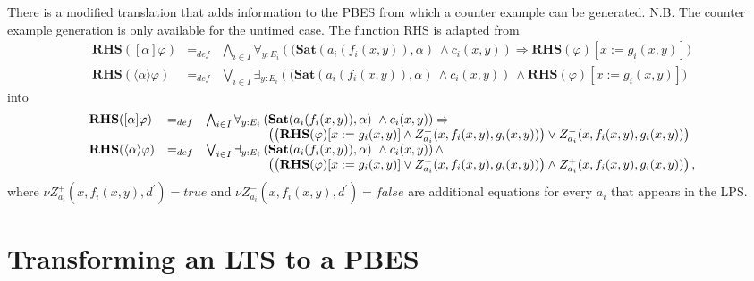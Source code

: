 There is a modified translation that adds information to the PBES from which
a counter example can be generated. N.B. The counter example generation is
only available for the untimed case. The function RHS is adapted from%
\begin{equation*}
\begin{array}{lll}
{\mathbf{RHS}}([\alpha ]\varphi ) & =_{def} & \bigwedge_{i{\in }I}\forall _{y%
{:}E_{i}}\left( (\mathbf{Sat}(a_{i}(f_{i}(x,y)),\alpha )\ \wedge
c_{i}(x,y)\right) \Rightarrow {\mathbf{RHS}}(\varphi )[x:=g_{i}(x,y)]) \\ 
{\mathbf{RHS}}(\langle \alpha \rangle \varphi ) & =_{def} & \bigvee_{i{\in }%
I}\exists _{y{:}E_{i}}\left( (\mathbf{Sat}(a_{i}(f_{i}(x,y)),\alpha )\
\wedge c_{i}(x,y)\right) \ \wedge {\mathbf{RHS}}(\varphi )[x:=g_{i}(x,y)])%
\end{array}%
\end{equation*}%
into%
\begin{equation*}
\begin{array}{lll}
{\mathbf{RHS}}([\alpha ]\varphi ) & =_{def} & \bigwedge_{i{\in }I}\forall _{y%
{:}E_{i}}\left( \mathbf{Sat}(a_{i}(f_{i}(x,y)),\alpha )\ \wedge
c_{i}(x,y)\right) \Rightarrow  \\ 
&  & \phantom{\bigwedge_{i {\in} I} \forall_{y {:} E_i}(}\left( \left( {%
\mathbf{RHS}}(\varphi )[x:=g_{i}(x,y)]\wedge
Z_{a_{i}}^{+}(x,f_{i}(x,y),g_{i}(x,y))\right) \vee
Z_{a_{i}}^{-}(x,f_{i}(x,y),g_{i}(x,y))\right)  \\ 
{\mathbf{RHS}}(\langle \alpha \rangle \varphi ) & =_{def} & \bigvee_{i{\in }%
I}\exists _{y{:}E_{i}}\left( \mathbf{Sat}(a_{i}(f_{i}(x,y)),\alpha )\ \wedge
c_{i}(x,y)\right) \wedge  \\ 
&  & \phantom{\bigwedge_{i {\in} I} \forall_{y {:} E_i}(}\left( \left( {%
\mathbf{RHS}}(\varphi )[x:=g_{i}(x,y)]\vee
Z_{a_{i}}^{-}(x,f_{i}(x,y),g_{i}(x,y))\right) \wedge
Z_{a_{i}}^{+}(x,f_{i}(x,y),g_{i}(x,y))\right) ,%
\end{array}%
\end{equation*}%
where $\nu Z_{a_{i}}^{+}(x,f_{i}(x,y),d^{\prime })=true$ and $\nu
Z_{a_{i}}^{-}(x,f_{i}(x,y),d^{\prime })=false$ are additional equations for
every $a_{i}$ that appears in the LPS.

\newpage

\section{Transforming an LTS to a PBES}

